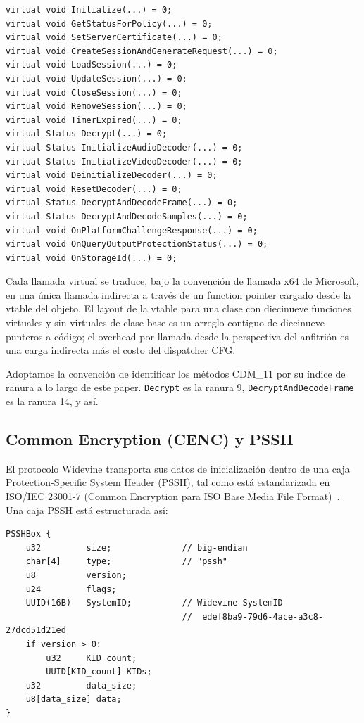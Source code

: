 \documentclass[11pt,letterpaper]{article}
\begin{document}
\begin{lstlisting}[basicstyle=\ttfamily\scriptsize]
virtual void Initialize(...) = 0;
virtual void GetStatusForPolicy(...) = 0;
virtual void SetServerCertificate(...) = 0;
virtual void CreateSessionAndGenerateRequest(...) = 0;
virtual void LoadSession(...) = 0;
virtual void UpdateSession(...) = 0;
virtual void CloseSession(...) = 0;
virtual void RemoveSession(...) = 0;
virtual void TimerExpired(...) = 0;
virtual Status Decrypt(...) = 0;
virtual Status InitializeAudioDecoder(...) = 0;
virtual Status InitializeVideoDecoder(...) = 0;
virtual void DeinitializeDecoder(...) = 0;
virtual void ResetDecoder(...) = 0;
virtual Status DecryptAndDecodeFrame(...) = 0;
virtual Status DecryptAndDecodeSamples(...) = 0;
virtual void OnPlatformChallengeResponse(...) = 0;
virtual void OnQueryOutputProtectionStatus(...) = 0;
virtual void OnStorageId(...) = 0;
\end{lstlisting}

Cada llamada virtual se traduce, bajo la convención de llamada
x64 de Microsoft, en una única llamada indirecta a través de un
function pointer cargado desde la vtable del objeto. El layout de
la vtable para una clase con diecinueve funciones virtuales y sin
virtuales de clase base es un arreglo contiguo de diecinueve
punteros a código; el overhead por llamada desde la perspectiva
del anfitrión es una carga indirecta más el costo del dispatcher
CFG.

Adoptamos la convención de identificar los métodos CDM\_11 por su
índice de ranura a lo largo de este paper. \texttt{Decrypt} es la
ranura 9, \texttt{DecryptAndDecodeFrame} es la ranura 14, y así.

\subsection{Common Encryption (CENC) y PSSH}
\label{sec:bg-cenc}

El protocolo Widevine transporta sus datos de inicialización
dentro de una caja Protection-Specific System Header (PSSH), tal
como está estandarizada en ISO/IEC 23001-7 (Common Encryption
para ISO Base Media File Format)~\cite{iso-cenc, w3c-pssh}. Una
caja PSSH está estructurada así:

\begin{lstlisting}[basicstyle=\ttfamily\scriptsize]
PSSHBox {
    u32         size;              // big-endian
    char[4]     type;              // "pssh"
    u8          version;
    u24         flags;
    UUID(16B)   SystemID;          // Widevine SystemID
                                   //  edef8ba9-79d6-4ace-a3c8-27dcd51d21ed
    if version > 0:
        u32     KID_count;
        UUID[KID_count] KIDs;
    u32         data_size;
    u8[data_size] data;
}
\end{lstlisting}
\end{document}
